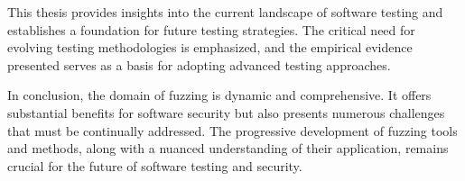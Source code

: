 This thesis provides insights into the current landscape of software testing
and establishes a foundation for future testing strategies. The critical need
for evolving testing methodologies is emphasized, and the empirical evidence
presented serves as a basis for adopting advanced testing approaches.

In conclusion, the domain of fuzzing is dynamic and comprehensive. It offers
substantial benefits for software security but also presents numerous challenges
that must be continually addressed. The progressive development of fuzzing tools
and methods, along with a nuanced understanding of their application, remains
crucial for the future of software testing and security.
